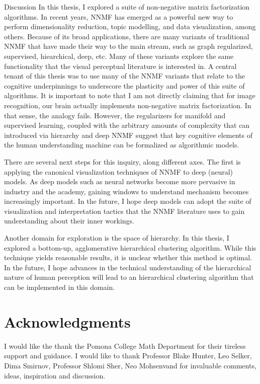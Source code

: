 \documentclass[12pt]{pom_thesis}
\begin{document}
\begin{chapter}{Discussion}
	In this thesis, I explored a suite of non-negative matrix factorization algorithms. In recent years, NNMF has emerged as a powerful new way to perform dimensionality reduction, topic modelling, and data visualization, among others. Because of its broad applications, there are many variants of traditional NNMF that have made their way to the main stream, such as graph regularized, supervised, hiearchical, deep, etc. Many of these variants explore the same functionality that the visual perceptual literature is interested in.  A central tenant of this thesis was to use many of the NNMF variants that relate to the cognitive underpinnings to underscore the plasticity and power of this suite of algorithms. It is important to note that I am not directly claiming that for image recognition, our brain actually implements non-negative matrix factorization. In that sense, the analogy fails. However, the regularizers for manifold and supervised learning, coupled with the arbitrary amounts of complexity that can introduced via hierarchy and deep NNMF suggest that key cognitive elements of the human understanding machine can be formalized as algorithmic models. 
	
	There are several next steps for this inquiry, along different axes. The first is applying the canonical visualization techniques of NNMF to deep (neural) models. As deep models such as neural networks become more pervasive in industry and the academy, gaining windows to understand mechanism becomes increasingly important. In the future, I hope deep models can adopt the suite of visualization and interpretation tactics that the NNMF literature uses to gain understanding about their inner workings. 
	
	Another domain for exploration is the space of hierarchy. In this thesis, I explored a bottom-up, agglomerative hierarchical clustering algorithm. While this technique yields reasonable results, it is unclear whether this method is optimal. In the future, I hope advances in the technical understanding of the hierarchical nature of human perception will lead to an hierarchical clustering algorithm that can be implemented in this domain.
	
	\end{chapter}
\section*{Acknowledgments}
I would like the thank the Pomona College Math Department for their tireless support and guidance.  I would like to thank Professor Blake Hunter, Leo Selker, Dima Smirnov, Professor Shlomi Sher, Neo Mohsenvand for invaluable comments, ideas, inspiration and discussion. 
\newpage
\end{document}
